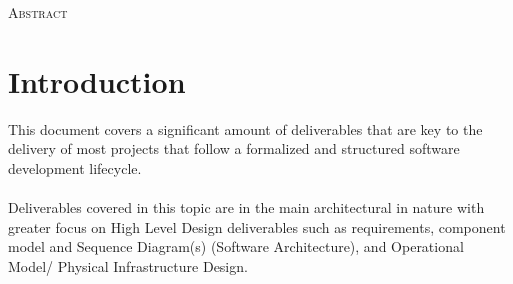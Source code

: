 \documentclass[12pt]{article} %
\begin{document}
		
		\newpage
	
	
	\begin{flushleft}\large
		\textsc{Abstract}\\
		
	\end{flushleft}
	
	
	\vfill %
	
	\newpage
	
	
	\tableofcontents %
	
	\newpage %
	
	
	\section{Introduction} %
	
This document covers a significant amount of deliverables that are key to the delivery of most projects that follow a formalized and structured software development lifecycle.
\\
\\
Deliverables covered in this topic are in the main architectural in nature with greater focus on High Level Design deliverables such as requirements, component model and Sequence Diagram(s) (Software Architecture), and Operational Model/ Physical Infrastructure Design.



\end{document}
